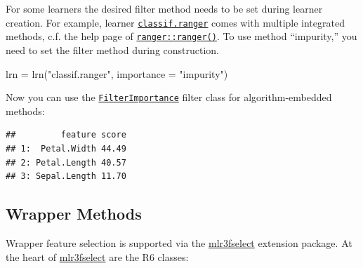 \documentclass[
]{scrbook}
\newenvironment{Shaded}{\begin{snugshade}}{\end{snugshade}}
\newcommand{\AttributeTok}[1]{\textcolor[rgb]{0.77,0.63,0.00}{#1}}
\newcommand{\DecValTok}[1]{\textcolor[rgb]{0.00,0.00,0.81}{#1}}
\newcommand{\FunctionTok}[1]{\textcolor[rgb]{0.00,0.00,0.00}{#1}}
\newcommand{\NormalTok}[1]{#1}
\newcommand{\OtherTok}[1]{\textcolor[rgb]{0.56,0.35,0.01}{#1}}
\newcommand{\SpecialCharTok}[1]{\textcolor[rgb]{0.00,0.00,0.00}{#1}}
\newcommand{\StringTok}[1]{\textcolor[rgb]{0.31,0.60,0.02}{#1}}
\renewenvironment{Shaded} {\begin{snugshade}\small} {\end{snugshade}}
\begin{document}
For some learners the desired filter method needs to be set during learner creation.
For example, learner \href{https://mlr3learners.mlr-org.com/reference/mlr_learners_classif.ranger.html}{\texttt{classif.ranger}} comes with multiple integrated methods, c.f. the help page of \href{https://www.rdocumentation.org/packages/ranger/topics/ranger}{\texttt{ranger::ranger()}}.
To use method ``impurity,'' you need to set the filter method during construction.

\begin{Shaded}
\begin{Highlighting}[]
\NormalTok{lrn }\OtherTok{=} \FunctionTok{lrn}\NormalTok{(}\StringTok{"classif.ranger"}\NormalTok{, }\AttributeTok{importance =} \StringTok{"impurity"}\NormalTok{)}
\end{Highlighting}
\end{Shaded}

Now you can use the \href{https://mlr3filters.mlr-org.com/reference/mlr_filters_importance.html}{\texttt{FilterImportance}} filter class for algorithm-embedded methods:

\begin{Shaded}
\end{Shaded}

\begin{verbatim}
##         feature score
## 1:  Petal.Width 44.49
## 2: Petal.Length 40.57
## 3: Sepal.Length 11.70
\end{verbatim}

\hypertarget{fs-wrapper}{%
\subsection{Wrapper Methods}\label{fs-wrapper}}

Wrapper feature selection is supported via the \href{https://mlr3fselect.mlr-org.com}{mlr3fselect} extension package.
At the heart of \href{https://mlr3fselect.mlr-org.com}{mlr3fselect} are the R6 classes:
\end{document}
